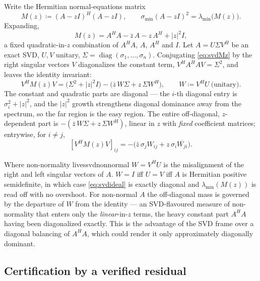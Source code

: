 \documentclass[11pt, a4paper]{article}
\numberwithin{equation}{section}
\newcommand{\abs}[1]{\left|#1\right|}
\begin{document}
Write the Hermitian normal-equations matrix
\[
  M(z) \coloneqq (A - zI)^H(A - zI),
  \qquad \sigma_{\min}(A - zI)^2 = \lambda_{\min}\bigl(M(z)\bigr).
\]
Expanding,
\begin{equation}\label{eq:svdMz}
  M(z) = A^H A - \bar z\,A - z\,A^H + \abs{z}^2 I,
\end{equation}
a fixed quadratic-in-$z$ combination of $A^HA$, $A$, $A^H$ and $I$.  Let $A =
U\Sigma V^H$ be an exact SVD, $U,V$ unitary, $\Sigma =
\operatorname{diag}(\sigma_1,\ldots,\sigma_n)$.  Conjugating \eqref{eq:svdMz} by
the right singular vectors $V$ diagonalizes the constant term, $V^H A^H A V =
\Sigma^2$, and leaves the identity invariant:
\begin{equation}\label{eq:svdideal}
  V^H M(z) V = \bigl(\Sigma^2 + \abs{z}^2 I\bigr)
    - \bigl(\bar z\,W\Sigma + z\,\Sigma W^H\bigr),
  \qquad W \coloneqq V^H U \ \text{(unitary)}.
\end{equation}
The constant and quadratic parts are diagonal --- the $i$-th diagonal entry is
$\sigma_i^2 + \abs{z}^2$, and the $\abs{z}^2$ growth strengthens diagonal
dominance away from the spectrum, so the far region is the easy region.  The
entire off-diagonal, $z$-dependent part is $-(\bar z\,W\Sigma + z\,\Sigma W^H)$,
linear in $z$ with \emph{fixed} coefficient matrices; entrywise, for $i \ne j$,
\[
  [V^H M(z) V]_{ij} = -\bigl(\bar z\,\sigma_j W_{ij}
    + z\,\sigma_i\overline{W_{ji}}\bigr).
\]

\begin{remark}{Where non-normality lives}{svdnonnormal}
  $W = V^H U$ is the misalignment of the right and left singular vectors of $A$.
  $W = I$ iff $U = V$ iff $A$ is Hermitian positive semidefinite, in which case
  \eqref{eq:svdideal} is exactly diagonal and $\lambda_{\min}(M(z))$ is read off
  with no overshoot.  For non-normal $A$ the off-diagonal mass is governed by the
  departure of $W$ from the identity --- an SVD-flavoured measure of
  non-normality that enters only the \emph{linear}-in-$z$ terms, the heavy
  constant part $A^HA$ having been diagonalized exactly.  This is the advantage
  of the SVD frame over a diagonal balancing of $A^HA$, which could render it
  only approximately diagonally dominant.
\end{remark}

\subsection{Certification by a verified residual}
\end{document}

